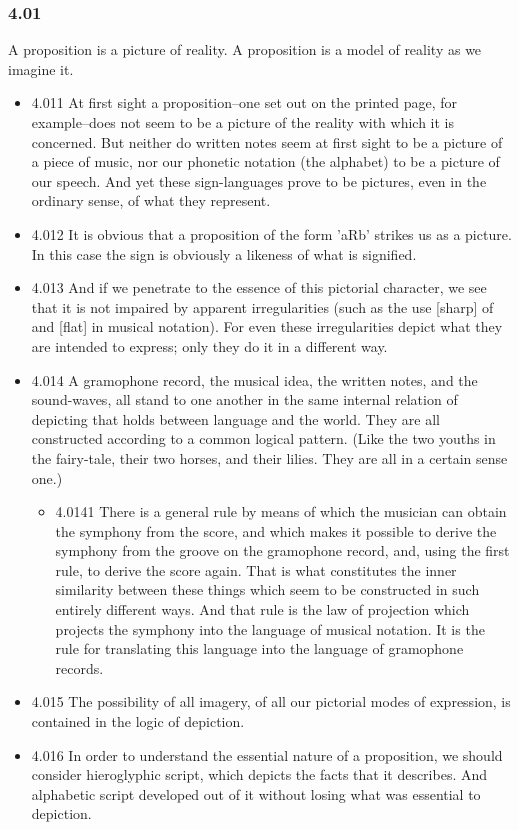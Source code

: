 \documentclass[11pt]{article}
\begin{document}
\subsubsection*{4.01}
\label{sec:org72b6732}
A proposition is a picture of reality. A proposition is a model of
reality as we imagine it.
\begin{itemize}
\item 4.011
\label{sec:org2af48d4}
At first sight a proposition--one set out on the printed page, for
example--does not seem to be a picture of the reality with which it is
concerned. But neither do written notes seem at first sight to be a picture
of a piece of music, nor our phonetic notation (the alphabet) to be a
picture of our speech. And yet these sign-languages prove to be pictures,
even in the ordinary sense, of what they represent.
\item 4.012
\label{sec:org074ff75}
It is obvious that a proposition of the form 'aRb' strikes us as a
picture. In this case the sign is obviously a likeness of what is
signified.
\item 4.013
\label{sec:orga5df801}
And if we penetrate to the essence of this pictorial character, we
see that it is not impaired by apparent irregularities (such as the use
[sharp] of and [flat] in musical notation). For even these irregularities
depict what they are intended to express; only they do it in a different
way.
\item 4.014
\label{sec:org6fa75f1}
A gramophone record, the musical idea, the written notes, and the
sound-waves, all stand to one another in the same internal relation of
depicting that holds between language and the world. They are all
constructed according to a common logical pattern. (Like the two youths in
the fairy-tale, their two horses, and their lilies. They are all in a
certain sense one.)
\begin{itemize}
\item 4.0141
\label{sec:orgc19e1dd}
There is a general rule by means of which the musician can obtain
the symphony from the score, and which makes it possible to derive the
symphony from the groove on the gramophone record, and, using the first
rule, to derive the score again. That is what constitutes the inner
similarity between these things which seem to be constructed in such
entirely different ways. And that rule is the law of projection which
projects the symphony into the language of musical notation. It is the rule
for translating this language into the language of gramophone records.
\end{itemize}
\item 4.015
\label{sec:org9373a1a}
The possibility of all imagery, of all our pictorial modes of
expression, is contained in the logic of depiction.
\item 4.016
\label{sec:orgfbd74a5}
In order to understand the essential nature of a proposition, we
should consider hieroglyphic script, which depicts the facts that it
describes. And alphabetic script developed out of it without losing what
was essential to depiction.
\end{itemize}
\end{document}

